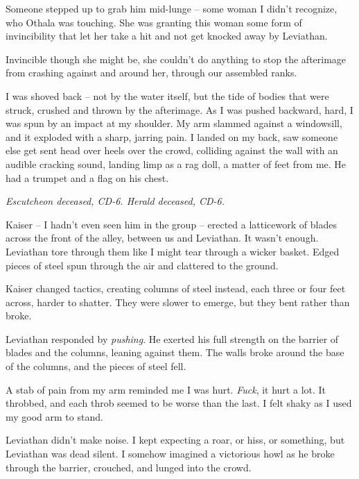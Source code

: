 Someone stepped up to grab him mid-lunge – some woman I didn't recognize, who Othala was touching.  She was granting this woman some form of invincibility that let her take a hit and not get knocked away by Leviathan.



Invincible though she might be, she couldn't do anything to stop the afterimage from crashing against and around her, through our assembled ranks.



I was shoved back – not by the water itself, but the tide of bodies that were struck, crushed and thrown by the afterimage.  As I was pushed backward, hard, I was spun by an impact at my shoulder.  My arm slammed against a windowsill, and it exploded with a sharp, jarring pain.  I landed on my back, saw someone else get sent head over heels over the crowd, colliding against the wall with an audible cracking sound, landing limp as a rag doll, a matter of feet from me.  He had a trumpet and a flag on his chest.



\emph{Escutcheon deceased, CD-6.  Herald deceased, CD-6.}



Kaiser – I hadn't even seen him in the group – erected a latticework of blades across the front of the alley, between us and Leviathan.  It wasn't enough.  Leviathan tore through them like I might tear through a wicker basket.  Edged pieces of steel spun through the air and clattered to the ground.



Kaiser changed tactics, creating columns of steel instead, each three or four feet across, harder to shatter.  They were slower to emerge, but they bent rather than broke.



Leviathan responded by \emph{pushing}. He exerted his full strength on the barrier of blades and the columns, leaning against them.  The walls broke around the base of the columns, and the pieces of steel fell.



A stab of pain from my arm reminded me I was hurt. \emph{Fuck}, it hurt a lot.  It throbbed, and each throb seemed to be worse than the last.  I felt shaky as I used my good arm to stand.



Leviathan didn't make noise.  I kept expecting a roar, or hiss, or something, but Leviathan was dead silent.  I somehow imagined a victorious howl as he broke through the barrier, crouched, and lunged into the crowd.



